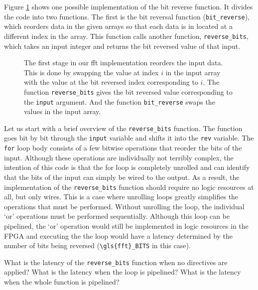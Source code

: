 Figure \ref{fig:fft_bit_reverse} shows one possible implementation of the bit reverse function. It divides the code into two functions. The first is the bit reversal function (\lstinline|bit_reverse|), which reorders data in the given arrays so that each data is in located at a different index in the array. This function calls another function, \lstinline|reverse_bits|, which takes an input integer and returns the bit reversed value of that input.

\begin{figure}
\begin{scriptsize}

\end{scriptsize}
\caption{ The first stage in our \gls{fft} implementation reorders the input data. This is done by swapping the value at index $i$ in the input array with the value at the bit reversed index corresponding to $i$. The function \lstinline|reverse_bits| gives the bit reversed value corresponding to the \lstinline|input| argument. And the function \lstinline|bit_reverse| swaps the values in the input array. }
\label{fig:fft_bit_reverse}
\end{figure}

Let us start with a brief overview of the \lstinline|reverse_bits| function. The function goes bit by bit through the \lstinline|input| variable and shifts it into the \lstinline|rev| variable. The \lstinline|for| loop body consists of a few bitwise operations that reorder the bits of the input. Although these operations are individually not terribly complex, the intention of this code is that the for loop is completely unrolled and \VHLS can identify that the bits of the input can simply be wired to the output.  As a result, the implementation of the \lstinline|reverse_bits| function should require no logic resources at all, but only wires.  This is a case where unrolling loops greatly simplifies the operations that must be performed.  Without unrolling the loop, the individual `or' operations must be performed sequentially.  Although this loop can be pipelined, the `or' operation would still be implemented in logic resources in the FPGA and executing the the loop would have a latency determined by the number of bits being reversed (\lstinline|\gls{fft}_BITS| in this case).

\begin{exercise}
What is the latency of the \lstinline|reverse_bits| function when no directives are applied? What is the latency when the loop is pipelined?  What is the latency when the whole function is pipelined?
\end{exercise}

